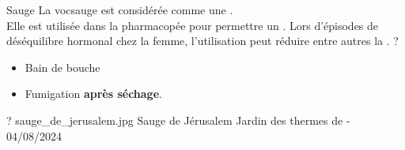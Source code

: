 \ficheidentiteplante
{Sauge}
{%
    La voc{sauge} est considérée comme une .\\ 
    Elle est utilisée dans la pharmacopée pour permettre un .
}
{%
    Lors d'épisodes de déséquilibre hormonal chez la femme, l'utilisation peut réduire entre autres la . 
}
{%
    ?
}
{%
    \begin{itemize}[label = \bcplume]
        \item Bain de bouche
        \item Fumigation \textbf{après séchage}.
    \end{itemize}
}
{%
    ?
}
{%
    sauge_de_jerusalem.jpg
}
{%
    Sauge de Jérusalem
}
{%
    Jardin des thermes de  - 04/08/2024 
}
